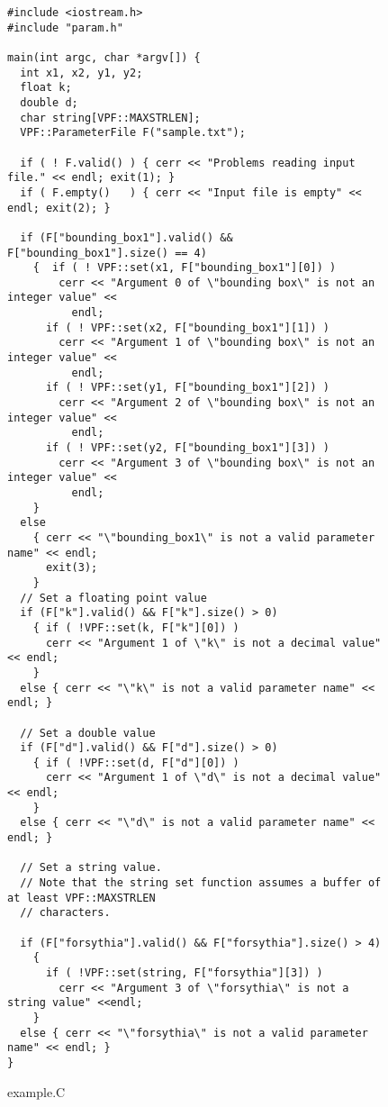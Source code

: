\documentclass{article}
\begin{document}
\begin{figure}
\footnotesize
\begin{verbatim}
#include <iostream.h>
#include "param.h"

main(int argc, char *argv[]) {
  int x1, x2, y1, y2;
  float k;
  double d;
  char string[VPF::MAXSTRLEN];
  VPF::ParameterFile F("sample.txt");

  if ( ! F.valid() ) { cerr << "Problems reading input file." << endl; exit(1); }
  if ( F.empty()   ) { cerr << "Input file is empty" << endl; exit(2); }
  
  if (F["bounding_box1"].valid() && F["bounding_box1"].size() == 4)
	{  if ( ! VPF::set(x1, F["bounding_box1"][0]) )
		cerr << "Argument 0 of \"bounding box\" is not an integer value" <<
		  endl;
	  if ( ! VPF::set(x2, F["bounding_box1"][1]) )
  		cerr << "Argument 1 of \"bounding box\" is not an integer value" <<
		  endl;
	  if ( ! VPF::set(y1, F["bounding_box1"][2]) )
  		cerr << "Argument 2 of \"bounding box\" is not an integer value" <<
		  endl;
	  if ( ! VPF::set(y2, F["bounding_box1"][3]) )
  		cerr << "Argument 3 of \"bounding box\" is not an integer value" <<
		  endl;
	}
  else
	{ cerr << "\"bounding_box1\" is not a valid parameter name" << endl;
	  exit(3);
	}
  // Set a floating point value
  if (F["k"].valid() && F["k"].size() > 0)
	{ if ( !VPF::set(k, F["k"][0]) )
	  cerr << "Argument 1 of \"k\" is not a decimal value" << endl;
	}
  else { cerr << "\"k\" is not a valid parameter name" << endl; }

  // Set a double value
  if (F["d"].valid() && F["d"].size() > 0)
	{ if ( !VPF::set(d, F["d"][0]) )
	  cerr << "Argument 1 of \"d\" is not a decimal value" << endl;
	}
  else { cerr << "\"d\" is not a valid parameter name" << endl; }

  // Set a string value.
  // Note that the string set function assumes a buffer of at least VPF::MAXSTRLEN
  // characters.
  
  if (F["forsythia"].valid() && F["forsythia"].size() > 4)
	{
	  if ( !VPF::set(string, F["forsythia"][3]) )
		cerr << "Argument 3 of \"forsythia\" is not a string value" <<endl;
	}
  else { cerr << "\"forsythia\" is not a valid parameter name" << endl; }
}
\end{verbatim}
\caption{example.C}
\label{samplecode}
\end{figure}
\end{document}
